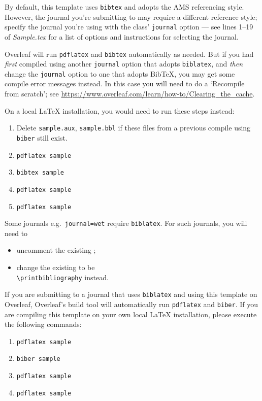 \documentclass[journal=gmj]{CUP-JNL-DTM}%
\theoremstyle{definition}
\numberwithin{equation}{section}
\begin{document}
By default, this template uses \texttt{bibtex} and adopts the AMS referencing style. However, the journal you’re submitting to may require a different reference style; specify the journal you're using with the class' \texttt{journal} option --- see lines 1--19 of \emph{Sample.tex} for a list of options and instructions for selecting the journal. 

Overleaf will run \texttt{pdflatex} and \texttt{bibtex} automatically as needed. But if you had \emph{first} compiled using another \texttt{journal} option that adopts \texttt{biblatex}, and \emph{then} change the \texttt{journal} option to one that adopts Bib\TeX{}, you may get some compile error messages instead. In this case you will need to do a `Recompile from scratch'; see \url{https://www.overleaf.com/learn/how-to/Clearing_the_cache}.

On a local \LaTeX{} installation, you would need to run these steps instead:
\begin{enumerate}
    \item Delete \texttt{sample.aux}, \texttt{sample.bbl} if these files from a previous compile using \texttt{biber} still exist.
    \item \verb|pdflatex sample|
    \item \verb|bibtex sample|
    \item \verb|pdflatex sample|
    \item \verb|pdflatex sample|
\end{enumerate}

Some journals e.g.~\texttt{journal=wet} require \texttt{biblatex}. For such journals, you will need to
\begin{itemize}
    \item uncomment the existing \verb||;
    \item change the existing \verb|| to be\\
    \verb|\printbibliography| instead.
\end{itemize} 

If you are submitting to a journal that uses \texttt{biblatex} and using this template on Overleaf, Overleaf's build tool will automatically run \texttt{pdflatex} and \texttt{biber}. If you are compiling this template on your own local \LaTeX{} installation, please execute the following commands:
\begin{enumerate}
    \item \verb|pdflatex sample|
    \item \verb|biber sample|
    \item \verb|pdflatex sample|
    \item \verb|pdflatex sample|
\end{enumerate}
\end{document}

